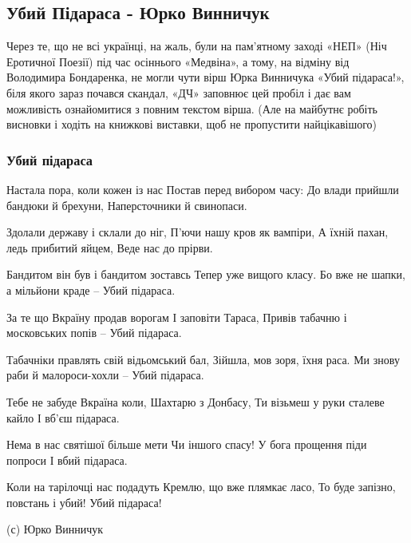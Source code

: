  
 
 

\subsection{Убий Підараса - Юрко Винничук}
\label{sec:nenavyst.virshi.ubyy_pidarasa}

Через те, що не всі українці, на жаль, були на пам’ятному заході «НЕП» (Ніч
Еротичної Поезії) під час осіннього «Медвіна», а тому, на відміну від
Володимира Бондаренка, не могли чути вірш Юрка Винничука «Убий підараса!», біля
якого зараз почався скандал, «ДЧ» заповнює цей пробіл і дає вам можливість
ознайомитися з повним текстом вірша. (Але на майбутнє робіть висновки і ходіть
на книжкові виставки, щоб не пропустити найцікавішого)

\subsubsection{Убий підараса}

Настала пора, коли кожен із нас
Постав перед вибором часу:
До влади прийшли бандюки й брехуни,
Наперсточники й свинопаси.

Здолали державу і склали до ніг,
П’ючи нашу кров як вампіри,
А їхній пахан, ледь прибитий яйцем,
Веде нас до прірви.

Бандитом він був і бандитом зоставсь
Тепер уже вищого класу.
Бо вже не шапки, а мільйони краде –
Убий підараса.

За те що Вкраїну продав ворогам
І заповіти Тараса,
Привів табачню і московських попів –
Убий підараса.

Табачніки правлять свій відьомський бал,
Зійшла, мов зоря, їхня раса.
Ми знову раби й малороси-хохли –
Убий підараса.

Тебе не забуде Вкраїна коли,
Шахтарю з Донбасу,
Ти візьмеш у руки сталеве кайло
І вб’єш підараса.

Нема в нас святішої більше мети
Чи іншого спасу!
У бога прощення піди попроси
І вбий підараса.

Коли на тарілочці нас подадуть
Кремлю, що вже плямкає ласо,
То буде запізно, повстань і убий!
Убий підараса!

(с) Юрко Винничук
